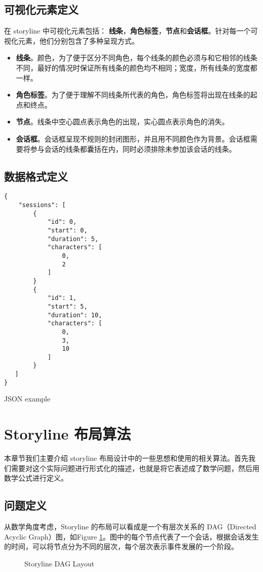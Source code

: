 \subsection{可视化元素定义}
在 storyline 中可视化元素包括： \textbf{线条}，\textbf{角色标签}，\textbf{节点}和\textbf{会话框}。针对每一个可视化元素，他们分别包含了多种呈现方式。
\begin{itemize}
\item \textbf{线条}。颜色，为了便于区分不同角色，每个线条的颜色必须与和它相邻的线条不同，最好的情况时保证所有线条的颜色均不相同；宽度，所有线条的宽度都一样。
\item \textbf{角色标签}。为了便于理解不同线条所代表的角色，角色标签将出现在线条的起点和终点。
\item \textbf{节点}。线条中空心圆点表示角色的出现，实心圆点表示角色的消失。
\item \textbf{会话框}。会话框呈现不规则的封闭图形，并且用不同颜色作为背景。会话框需要将参与会话的线条都囊括在内，同时必须排除未参加该会话的线条。
\end{itemize}


\subsection{数据格式定义}
\begin{listing}
\begin{verbatim}
{
    "sessions": [
        {
            "id": 0,
            "start": 0,
            "duration": 5,
            "characters": [
                0,
                2
            ]
        }
        {
            "id": 1,
            "start": 5,
            "duration": 10,
            "characters": [
                0,
                3,
                10
            ]
        }
   ]
}
\end{verbatim}
\caption{JSON example} 
\label{json-example}
\end{listing}

\section{Storyline 布局算法}
本章节我们主要介绍 storyline 布局设计中的一些思想和使用的相关算法。首先我们需要对这个实际问题进行形式化的描述，也就是将它表述成了数学问题，然后用数学公式进行定义。
\subsection{问题定义}
 从数学角度考虑，Storyline 的布局可以看成是一个有层次关系的 DAG（Directed Acyclic Graph）图，如Figure \ref{storyline-dag}。图中的每个节点代表了一个会话，根据会话发生的时间，可以将节点分为不同的层次，每个层次表示事件发展的一个阶段。
\begin{figure}[!h]
  \caption{Storyline DAG Layout}
  \label{storyline-dag}
\end{figure}

